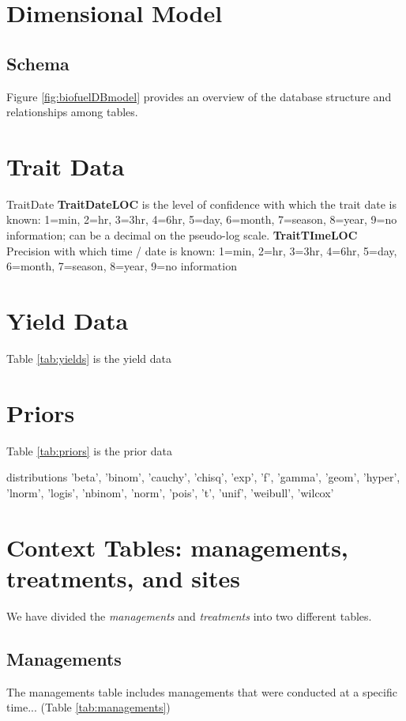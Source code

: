 \begin{enumerate}
\section{Dimensional Model}

\subsection{Schema}
Figure \ref{fig:biofuelDBmodel} provides an overview of the database structure and relationships among tables.

\section{Trait Data}


\par{TraitDate}
\textbf{TraitDateLOC} is the level of confidence with which the trait date is known: 1=min, 2=hr, 3=3hr, 4=6hr, 5=day, 6=month, 7=season, 8=year, 9=no information; can be a decimal on the pseudo-log scale.
\textbf{TraitTImeLOC} Precision with which time / date is known: 1=min, 2=hr, 3=3hr, 4=6hr, 5=day, 6=month, 7=season, 8=year, 9=no information
\section{Yield Data}
Table \ref{tab:yields} is the yield data

\section{Priors}
Table \ref{tab:priors} is the prior data

\par{distributions}
'beta', 'binom', 'cauchy', 'chisq', 'exp', 'f', 'gamma', 'geom', 'hyper', 'lnorm', 'logis', 'nbinom', 'norm', 'pois', 't', 'unif', 'weibull', 'wilcox'

\section{Context Tables: managements, treatments, and sites}

We have divided the \textit{managements} and \textit{treatments} into two different tables. 
\subsection{Managements} The managements table includes managements that were conducted at a specific time... (Table \ref{tab:managements})




\end{enumerate}
